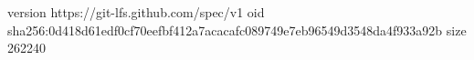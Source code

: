 version https://git-lfs.github.com/spec/v1
oid sha256:0d418d61edf0cf70eefbf412a7acacafc089749e7eb96549d3548da4f933a92b
size 262240

